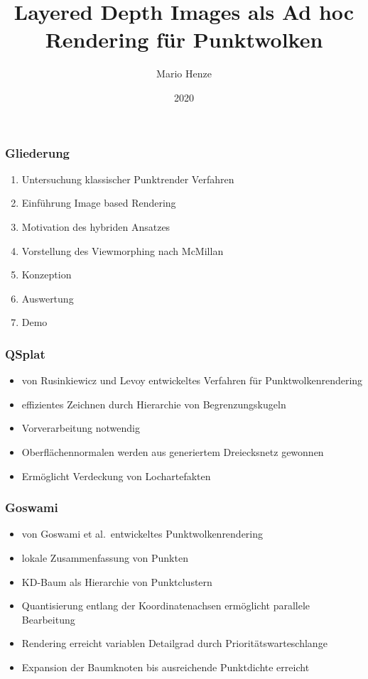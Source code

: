 \documentclass[aspectratio=169]{beamer}
\title{Layered Depth Images als Ad hoc Rendering für Punktwolken}
\author{Mario Henze}
\institute{Professur für Computergrafik und Visualisierung}
\date{2020}
\begin{document}
\frame{\titlepage}

\begin{frame}
    \frametitle{Gliederung}
    \begin{enumerate}
        \item Untersuchung klassischer Punktrender Verfahren
        \item Einführung Image based Rendering
        \item Motivation des hybriden Ansatzes
        \item Vorstellung des Viewmorphing nach McMillan
        \item Konzeption
        \item Auswertung
        \item Demo
    \end{enumerate}
\end{frame}

\begin{frame}
    \frametitle{QSplat}
    \begin{itemize}
        \item von Rusinkiewicz und Levoy entwickeltes Verfahren für Punktwolkenrendering
        \item effizientes Zeichnen durch Hierarchie von Begrenzungskugeln
        \item Vorverarbeitung notwendig
        \item Oberflächennormalen werden aus generiertem Dreiecksnetz gewonnen
        \item Ermöglicht Verdeckung von Lochartefakten
    \end{itemize}
\end{frame}

\begin{frame}
    \frametitle{Goswami}
    \begin{itemize}
        \item von Goswami et al.\ entwickeltes Punktwolkenrendering
        \item lokale Zusammenfassung von Punkten
        \item KD-Baum als Hierarchie von Punktclustern
        \item Quantisierung entlang der Koordinatenachsen ermöglicht parallele Bearbeitung
        \item Rendering erreicht variablen Detailgrad durch Prioritätswarteschlange
        \item Expansion der Baumknoten bis ausreichende Punktdichte erreicht
    \end{itemize}
\end{frame}
\end{document}
